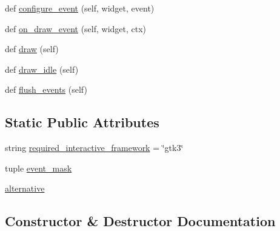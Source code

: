 \begin{DoxyCompactItemize}
def \hyperlink{classmatplotlib_1_1backends_1_1backend__gtk3_1_1FigureCanvasGTK3_ad51bdd8d792b51c69891386b8927a906}{configure\+\_\+event} (self, widget, event)
\item 
def \hyperlink{classmatplotlib_1_1backends_1_1backend__gtk3_1_1FigureCanvasGTK3_af87196eb9b9243c6d880cf03f5a329ee}{on\+\_\+draw\+\_\+event} (self, widget, ctx)
\item 
def \hyperlink{classmatplotlib_1_1backends_1_1backend__gtk3_1_1FigureCanvasGTK3_ab089870be2a9d790a12deeec215d0cbc}{draw} (self)
\item 
def \hyperlink{classmatplotlib_1_1backends_1_1backend__gtk3_1_1FigureCanvasGTK3_affc2a2597251a5f3d34089efa10dbbdd}{draw\+\_\+idle} (self)
\item 
def \hyperlink{classmatplotlib_1_1backends_1_1backend__gtk3_1_1FigureCanvasGTK3_a727b03c5bd246c3450e72f0626d3d23c}{flush\+\_\+events} (self)
\end{DoxyCompactItemize}
\subsection*{Static Public Attributes}
\begin{DoxyCompactItemize}
\item 
string \hyperlink{classmatplotlib_1_1backends_1_1backend__gtk3_1_1FigureCanvasGTK3_a2c67390c620a0fb0fbb24eeab5469d60}{required\+\_\+interactive\+\_\+framework} = \char`\"{}gtk3\char`\"{}
\item 
tuple \hyperlink{classmatplotlib_1_1backends_1_1backend__gtk3_1_1FigureCanvasGTK3_a89bffd0a4c65d81ad9a522234fe60466}{event\+\_\+mask}
\item 
\hyperlink{classmatplotlib_1_1backends_1_1backend__gtk3_1_1FigureCanvasGTK3_a6eef3f222f8b9c35825fd986065ff9e9}{alternative}
\end{DoxyCompactItemize}


\subsection{Constructor \& Destructor Documentation}
\mbox{\label{classmatplotlib_1_1backends_1_1backend__gtk3_1_1FigureCanvasGTK3_ae6d7cf4e39d78735fc3a76d8eb5cbce4}} 

